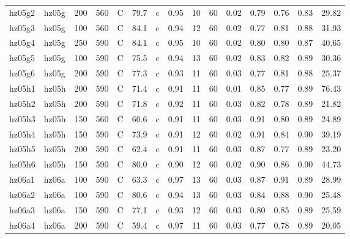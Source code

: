 \documentclass{article}
\begin{document}
\begin{landscape}
\begin{longtable}{llrrlrlrrrrrrrr}
      hz05g2 &      hz05g &  200 &  560 &     C &    79.7 &   c &  0.95 &  10 &         60 &  0.02 &  0.79 &  0.76 &  0.83 &   29.82 \\
      hz05g3 &      hz05g &  100 &  560 &     C &    84.1 &   c &  0.94 &  12 &         60 &  0.02 &  0.77 &  0.81 &  0.88 &   31.93 \\
      hz05g4 &      hz05g &  250 &  590 &     C &    84.1 &   c &  0.95 &  10 &         60 &  0.02 &  0.80 &  0.80 &  0.87 &   40.65 \\
      hz05g5 &      hz05g &  100 &  590 &     C &    75.5 &   c &  0.94 &  13 &         60 &  0.02 &  0.83 &  0.82 &  0.89 &   30.36 \\
      hz05g6 &      hz05g &  200 &  590 &     C &    77.3 &   c &  0.93 &  11 &         60 &  0.03 &  0.77 &  0.81 &  0.88 &   25.37 \\
      hz05h1 &      hz05h &  200 &  590 &     C &    71.4 &   c &  0.91 &  11 &         60 &  0.01 &  0.85 &  0.77 &  0.89 &   76.43 \\
      hz05h2 &      hz05h &  200 &  590 &     C &    71.8 &   c &  0.92 &  11 &         60 &  0.03 &  0.82 &  0.78 &  0.89 &   21.82 \\
      hz05h3 &      hz05h &  150 &  560 &     C &    60.6 &   c &  0.91 &  11 &         60 &  0.03 &  0.91 &  0.80 &  0.89 &   24.89 \\
      hz05h4 &      hz05h &  150 &  590 &     C &    73.9 &   c &  0.91 &  12 &         60 &  0.02 &  0.91 &  0.84 &  0.90 &   39.19 \\
      hz05h5 &      hz05h &  200 &  590 &     C &    62.4 &   c &  0.91 &  11 &         60 &  0.03 &  0.87 &  0.77 &  0.89 &   23.20 \\
      hz05h6 &      hz05h &  150 &  590 &     C &    80.0 &   c &  0.90 &  12 &         60 &  0.02 &  0.90 &  0.86 &  0.90 &   44.73 \\
      hz06a1 &      hz06a &  100 &  590 &     C &    63.3 &   c &  0.97 &  13 &         60 &  0.03 &  0.87 &  0.91 &  0.89 &   28.99 \\
      hz06a2 &      hz06a &  100 &  590 &     C &    80.6 &   c &  0.94 &  13 &         60 &  0.03 &  0.84 &  0.88 &  0.90 &   25.48 \\
      hz06a3 &      hz06a &  150 &  590 &     C &    77.1 &   c &  0.93 &  12 &         60 &  0.03 &  0.80 &  0.85 &  0.89 &   25.59 \\
      hz06a4 &      hz06a &  200 &  590 &     C &    59.4 &   c &  0.97 &  11 &         60 &  0.03 &  0.77 &  0.78 &  0.89 &   20.05 \\

\end{longtable}
\end{landscape}
\end{document}
